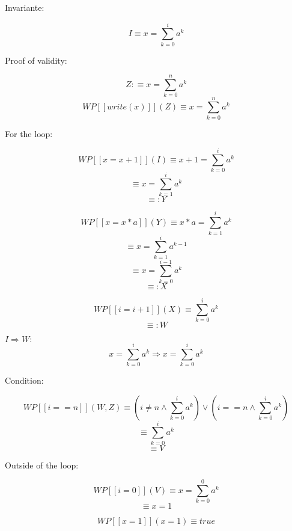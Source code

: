 \documentclass{article}
\begin{document}
Invariante:

$$ I \equiv x=\sum_{k=0}^{i} a^k $$

Proof of validity:

$$ Z:\equiv x=\sum_{k=0}^{n} a^k $$
$$ WP[\![write(x)]\!](Z) \equiv x=\sum_{k=0}^{n} a^k $$

For the loop:

$$ WP[\![x=x+1]\!](I) \equiv x+1=\sum_{k=0}^{i} a^k $$
$$ \equiv x=\sum_{k=1}^{i} a^k $$
$$ \equiv: Y $$

$$ WP[\![x=x*a]\!](Y) \equiv x*a=\sum_{k=1}^{i} a^k $$
$$ \equiv x=\sum_{k=1}^{i} a^{k-1} $$
$$ \equiv x=\sum_{k=0}^{i-1} a^k $$
$$ \equiv: X $$

$$ WP[\![i=i+1]\!](X) \equiv \sum_{k=0}^{i} a^k $$
$$ \equiv: W $$

$ I \Rightarrow W: $
$$ x=\sum_{k=0}^{i} a^k \Rightarrow x=\sum_{k=0}^{i} a^k $$

Condition:

$$ WP[\![i==n]\!](W, Z) \equiv (i \ne n \land \sum_{k=0}^{i} a^k) \lor (i==n \land \sum_{k=0}^{i} a^k) $$
$$ \equiv \sum_{k=0}^{i} a^k $$
$$ \equiv V $$

Outside of the loop:

$$ WP[\![i=0]\!](V) \equiv x=\sum_{k=0}^{0} a^k $$
$$ \equiv x=1 $$

$$ WP[\![x=1]\!](x=1) \equiv true $$
\end{document}
